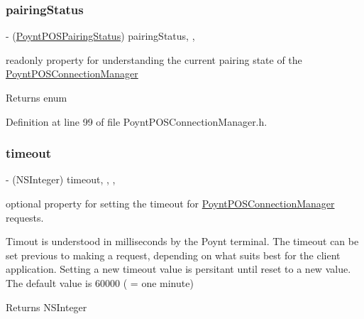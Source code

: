 \subsubsection{\texorpdfstring{pairing\+Status}{pairingStatus}}
{\footnotesize\ttfamily -\/ (\hyperlink{_poynt_p_o_s_connection_manager_8h_af6bc4a828ea6541e27d04eef1263513b}{Poynt\+P\+O\+S\+Pairing\+Status}) pairing\+Status\hspace{0.3cm}{\ttfamily [read]}, {\ttfamily [nonatomic]}, {\ttfamily [assign]}}



readonly property for understanding the current pairing state of the \hyperlink{interface_poynt_p_o_s_connection_manager}{Poynt\+P\+O\+S\+Connection\+Manager} 

\begin{DoxyReturn}{Returns}
enum 
\end{DoxyReturn}


Definition at line 99 of file Poynt\+P\+O\+S\+Connection\+Manager.\+h.

\hypertarget{interface_poynt_p_o_s_connection_manager_ad4ac67644bd591b45e7e45448681872d}{}\label{interface_poynt_p_o_s_connection_manager_ad4ac67644bd591b45e7e45448681872d} 
\subsubsection{\texorpdfstring{timeout}{timeout}}
{\footnotesize\ttfamily -\/ (N\+S\+Integer) timeout\hspace{0.3cm}{\ttfamily [read]}, {\ttfamily [write]}, {\ttfamily [nonatomic]}, {\ttfamily [assign]}}



optional property for setting the timeout for \hyperlink{interface_poynt_p_o_s_connection_manager}{Poynt\+P\+O\+S\+Connection\+Manager} requests. 

Timout is understood in milliseconds by the Poynt terminal. The timeout can be set previous to making a request, depending on what suits best for the client application. Setting a new timeout value is persitant until reset to a new value. The default value is 60000 ( = one minute)

\begin{DoxyReturn}{Returns}
N\+S\+Integer 
\end{DoxyReturn}


